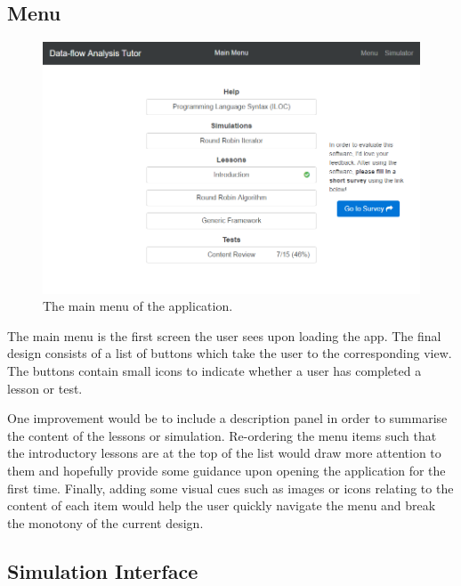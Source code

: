\documentclass[bsc,twoside,singlespacing,parskip,logo,notimes,normalheadings]{infthesis}
\begin{document}
        \subsection{Menu}\label{sec:impl-menu}

        \begin{figure}[!ht]
          \centering
          \includegraphics[width=\textwidth, trim=0 0 0 0]{img/menu.png}
          \captionsetup{width=\textwidth, justification=centering}
          \caption{The main menu of the application.}\label{fig:menus}
        \end{figure}

        The main menu is the first screen the user sees upon loading
        the app. The final design consists of a list of buttons which
        take the user to the corresponding view. The buttons contain
        small icons to indicate whether a user has completed a lesson
        or test.

        One improvement would be to include a description panel in
        order to summarise the content of the lessons or
        simulation. Re-ordering the menu items such that the
        introductory lessons are at the top of the list would draw
        more attention to them and hopefully provide some guidance
        upon opening the application for the first time. Finally,
        adding some visual cues such as images or icons relating to
        the content of each item would help the user quickly navigate
        the menu and break the monotony of the current design.

        \subsection{Simulation Interface}
\end{document}
